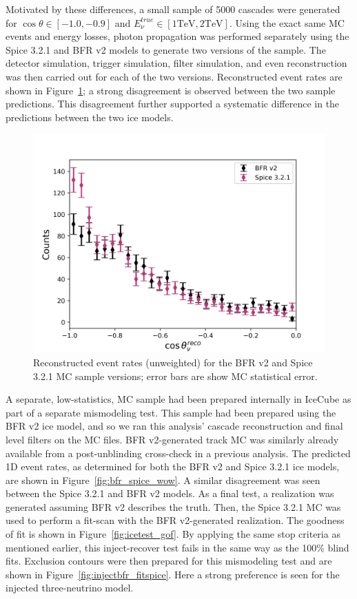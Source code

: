 \documentclass[main.tex]{subfiles}
\begin{document}
Motivated by these differences, a small sample of 5000 cascades were generated for $\cos\theta\in\left[-1.0, -0.9\right]$ and $E_{\nu}^{true}\in\left[1\text{TeV}, 2\text{TeV}\right]$. 
Using the exact same MC events and energy losses, photon propagation was performed separately using the Spice 3.2.1 and BFR v2 models to generate two versions of the sample.
The detector simulation, trigger simulation, filter simulation, and even reconstruction was then carried out for each of the two versions. 
Reconstructed event rates are shown in Figure~\ref{fig:icetest}; a strong disagreement is observed between the two sample predictions. 
This disagreement further supported a systematic difference in the predictions between the two ice models. 

\begin{figure}
    \centering
    \includegraphics[width=0.8\linewidth]{figures/ice_investigate/icetest.png}
    \caption{Reconstructed event rates (unweighted) for the BFR v2 and Spice 3.2.1 MC sample versions; error bars are show MC statistical error.}\label{fig:icetest}
\end{figure}

A separate, low-statistics, MC sample had been prepared internally in IceCube as part of a separate mismodeling test. 
This sample had been prepared using the BFR v2 ice model, and so we ran this analysis' cascade reconstruction and final level filters on the MC files. 
BFR v2-generated track MC was similarly already available from a post-unblinding cross-check in a previous analysis.
The predicted 1D event rates, as determined for both the BFR v2 and Spice 3.2.1 ice models, are shown in Figure~\ref{fig:bfr_spice_wow}. 
A similar disagreement was seen between the Spice 3.2.1 and BFR v2 models.
As a final test, a realization was generated assuming BFR v2 describes the truth.
Then, the Spice 3.2.1 MC was used to perform a fit-scan with the BFR v2-generated realization. 
The goodness of fit is shown in Figure~\ref{fig:icetest_gof}.
By applying the same stop criteria as mentioned earlier, this inject-recover test fails in the same way as the 100\% blind fits. 
Exclusion contours were then prepared for this mismodeling test and are shown in Figure~\ref{fig:injectbfr_fitspice}.
Here a strong preference is seen for the injected three-neutrino model. 
\end{document}
